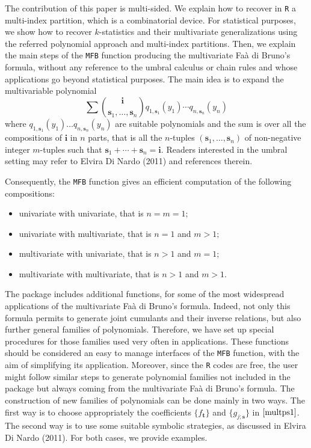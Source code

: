 The contribution of this paper is multi-sided. We explain how to recover in \texttt{R} a multi-index partition, which is a combinatorial device. For statistical purposes, we show how to recover \(k\)-statistics and their multivariate generalizations using the referred polynomial approach and multi-index partitions. Then, we explain the main steps of the \texttt{MFB} function producing the multivariate Faà di Bruno's formula, without any reference to the umbral calculus or chain rules and whose applications go beyond statistical purposes. The main idea is to expand the multivariable polynomial
\[ 
\sum {\boldsymbol{i} \choose \boldsymbol{s}_1,\ldots,\boldsymbol{s}_n} q_{1,\boldsymbol{s}_1}(y_1) \cdots q_{n,\boldsymbol{s}_n}(y_n)
\]
where \(q_{1,\boldsymbol{s}_1}(y_1) \ldots q_{n,\boldsymbol{s}_n}(y_n)\) are suitable polynomials and the sum is over all the compositions of \(\boldsymbol{i}\) in \(n\) parts, that is all the \(n\)-tuples
\((\boldsymbol{s}_1,\ldots,\boldsymbol{s}_n)\) of non-negative integer \(m\)-tuples such that \(\boldsymbol{s}_1 + \cdots + \boldsymbol{s}_n = \boldsymbol{i}.\)
Readers interested in the umbral setting may refer to Elvira Di Nardo (2011) and references therein.

Consequently, the \texttt{MFB} function gives an efficient computation of the following compositions:

\begin{itemize}
\item
  univariate with univariate, that is \(n=m=1;\)
\item
  univariate with multivariate, that is \(n=1\) and \(m >1;\)
\item
  multivariate with univariate, that is \(n >1\) and \(m=1;\)
\item
  multivariate with multivariate, that is \(n >1\) and \(m>1.\)
\end{itemize}

The  package includes additional functions, for some of the most widespread applications of the multivariate Faà di Bruno's formula. Indeed, not only this formula permits to generate joint cumulants and their inverse relations, but also further general families of polynomials. Therefore, we have set up special procedures for those families used very often in applications. These functions should be considered an easy to manage interfaces of the \texttt{MFB} function, with the aim of simplifying its application. Moreover, since the \texttt{R} codes are free, the user might follow similar steps to generate polynomial families not included in the package but
always coming from the multivariate Faà di Bruno's formula. The construction of new families of polynomials can be done mainly in two ways. The first way is to choose appropriately the coefficients \(\{f_{\boldsymbol{t}}\}\) and \(\{g_{j; \boldsymbol{s}}\}\) in \(\eqref{multps1}\). The second way is to use some suitable symbolic strategies, as discussed in Elvira Di Nardo (2011). For both cases, we provide examples.

